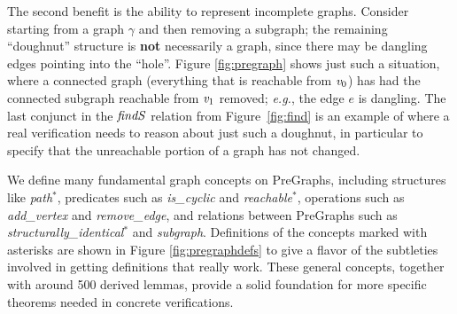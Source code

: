 The second benefit is the ability to represent incomplete graphs.
Consider starting from a graph $\gamma$ and then removing a subgraph; the remaining
``doughnut'' structure is \textbf{not} necessarily a graph, since there may be dangling
edges pointing into the ``hole''.  Figure \ref{fig:pregraph} shows just such a situation,
where a connected graph (everything that is reachable from $\mathit{v}_0$) has had the connected
subgraph reachable from $\mathit{v}_1$ removed; \emph{e.g.}, the edge $e$ is dangling.
The last conjunct in the $\mathit{findS}$ relation from Figure~\ref{fig:find} is an example
of where a real verification needs to reason about just such a doughnut, in particular
to specify that the unreachable portion of a graph has not changed.




We define many fundamental graph concepts on PreGraphs,
including structures like \emph{path}$^{*}$, predicates
such as \emph{is\_cyclic} and \emph{reachable}$^{*}$,
operations such as \emph{add\_vertex}
and \emph{remove\_edge}, and relations between PreGraphs such
as \emph{structurally\_identical}$^{*}$ and \emph{subgraph}.
Definitions of the concepts marked with asterisks are
shown in Figure \ref{fig:pregraphdefs} to give a flavor
of the subtleties involved in getting definitions that
really work.
These general concepts, together with around 500 derived lemmas,
provide a
solid foundation for more specific theorems needed in concrete
verifications.

